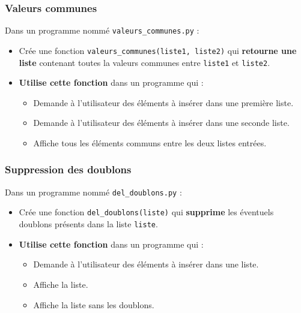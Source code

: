\documentclass[11pt]{article}
\begin{document}
\subsubsection*{Valeurs communes}
\label{sec:org925612e}
Dans un programme nommé \texttt{valeurs\_communes.py} :
\begin{itemize}
\item Crée une fonction \texttt{valeurs\_communes(liste1, liste2)} qui \textbf{retourne une liste} contenant toutes la valeurs communes entre \texttt{liste1} et \texttt{liste2}.
\item \textbf{Utilise cette fonction} dans un programme qui :
\begin{itemize}
\item Demande à l'utilisateur des éléments à insérer dans une première liste.
\item Demande à l'utilisateur des éléments à insérer dans une seconde liste.
\item Affiche tous les éléments communs entre les deux listes entrées.
\end{itemize}
\end{itemize}

\subsubsection*{Suppression des doublons}
\label{sec:org9faeeaa}
Dans un programme nommé \texttt{del\_doublons.py} :
\begin{itemize}
\item Crée une fonction \texttt{del\_doublons(liste)} qui \textbf{supprime} les éventuels doublons présents dans la liste \texttt{liste}.
\item \textbf{Utilise cette fonction} dans un programme qui :
\begin{itemize}
\item Demande à l'utilisateur des éléments à insérer dans une liste.
\item Affiche la liste.
\item Affiche la liste sans les doublons.
\end{itemize}
\end{itemize}
\end{document}
